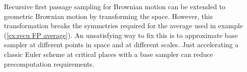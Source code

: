 \documentclass[a4paper,12pt]{article}
\begin{document}
Recursive first passage sampling for Brownian motion can be extended to geometric
Brownian motion by transforming the space. However, this  transformation breaks
the symmetries required for the average used in example (\ref{ex:recu FP average}).
An unsatisfying way to fix this is to approximate base sampler at different points in
space and at different scales. Just accelerating a classic Euler scheme at critical places
with a base sampler can reduce precomputation requirements.



\newpage
\printbibliography
\newpage

\end{document}
